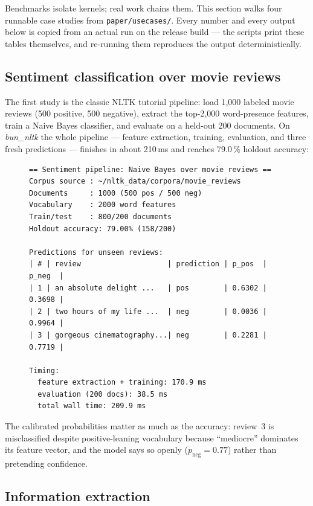 \documentclass[smallextended]{svjour3}
\begin{document}
Benchmarks isolate kernels; real work chains them. This section walks four runnable case studies from \texttt{paper/usecases/}. Every number and every output below is copied from an actual run on the release build --- the scripts print these tables themselves, and re-running them reproduces the output deterministically.

\subsection{Sentiment classification over movie reviews}
\label{sec:uc-sentiment}

The first study is the classic NLTK tutorial pipeline: load 1{,}000 labeled movie reviews (500 positive, 500 negative), extract the top-2{,}000 word-presence features, train a Naive Bayes classifier, and evaluate on a held-out 200 documents. On \emph{bun\_nltk} the whole pipeline --- feature extraction, training, evaluation, and three fresh predictions --- finishes in about 210\,ms and reaches 79.0\,\% holdout accuracy:

\begin{figure}[H]
\begin{lstlisting}[basicstyle=\ttfamily\scriptsize,caption={Captured output of \texttt{paper/usecases/sentiment\_pipeline.ts} (abridged).},label={lst:sentiment}]
== Sentiment pipeline: Naive Bayes over movie reviews ==
Corpus source : ~/nltk_data/corpora/movie_reviews
Documents     : 1000 (500 pos / 500 neg)
Vocabulary    : 2000 word features
Train/test    : 800/200 documents
Holdout accuracy: 79.00% (158/200)

Predictions for unseen reviews:
| # | review                    | prediction | p_pos  | p_neg  |
| 1 | an absolute delight ...   | pos        | 0.6302 | 0.3698 |
| 2 | two hours of my life ...  | neg        | 0.0036 | 0.9964 |
| 3 | gorgeous cinematography...| neg        | 0.2281 | 0.7719 |

Timing:
  feature extraction + training: 170.9 ms
  evaluation (200 docs): 38.5 ms
  total wall time: 209.9 ms
\end{lstlisting}
\end{figure}

The calibrated probabilities matter as much as the accuracy: review~3 is misclassified despite positive-leaning vocabulary because ``mediocre'' dominates its feature vector, and the model says so openly ($p_{\text{neg}}=0.77$) rather than pretending confidence.

\subsection{Information extraction}
\label{sec:uc-ie}
\end{document}
